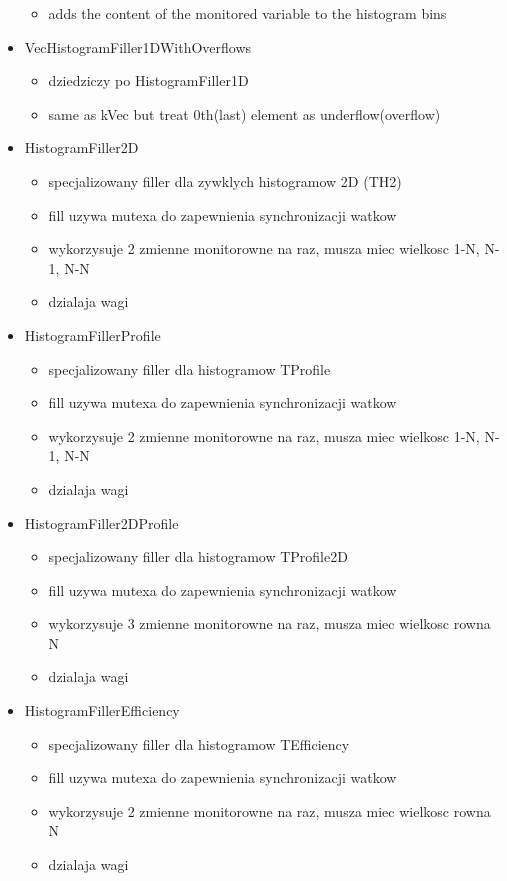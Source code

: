 \begin{itemize}
\begin{itemize}
	\item adds the content of the monitored variable to the histogram bins
	\end{itemize}
\item VecHistogramFiller1DWithOverflows
	\begin{itemize}
	\item dziedziczy po HistogramFiller1D
	\item same as kVec but treat 0th(last) element as underflow(overflow)
	\end{itemize}
\item HistogramFiller2D
	\begin{itemize}
	\item specjalizowany filler dla zywklych histogramow 2D (TH2)
	\item fill uzywa mutexa do zapewnienia synchronizacji watkow
	\item wykorzysuje 2 zmienne monitorowne na raz, musza miec wielkosc 1-N, N-1, N-N
	\item dzialaja wagi
	\end{itemize}
\item HistogramFillerProfile
	\begin{itemize}
	\item  specjalizowany filler dla histogramow TProfile
	\item fill uzywa mutexa do zapewnienia synchronizacji watkow
	\item wykorzysuje 2 zmienne monitorowne na raz, musza miec wielkosc 1-N, N-1, N-N
	\item dzialaja wagi
	\end{itemize}
\item HistogramFiller2DProfile
	\begin{itemize}
	\item  specjalizowany filler dla histogramow TProfile2D
	\item fill uzywa mutexa do zapewnienia synchronizacji watkow
	\item wykorzysuje 3 zmienne monitorowne na raz, musza miec wielkosc rowna N
	\item dzialaja wagi
	\end{itemize}
\item HistogramFillerEfficiency
	\begin{itemize}
	\item specjalizowany filler dla histogramow TEfficiency
	\item fill uzywa mutexa do zapewnienia synchronizacji watkow
	\item wykorzysuje 2 zmienne monitorowne na raz, musza miec wielkosc rowna N
	\item dzialaja wagi
	\end{itemize}
	

\end{itemize}
